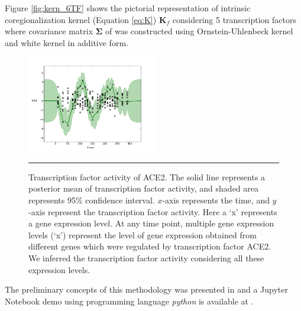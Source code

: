 Figure \ref{fig:kern_6TF} shows the pictorial representation of intrinsic coregionalization kernel (Equation \ref{eq:K}) $\textbf{K}_f$ considering 5 transcription factors where covariance matrix $\boldsymbol{\Sigma}$ of  was constructed using Ornstein-Uhlenbeck kernel and white kernel in additive form.
\begin{figure}[!htbp]
	\centering
	\includegraphics[width=0.5\textwidth,keepaspectratio]{diagrams/ACE2_OU_Wh_9TF.png}
	\rule{25em}{0.5pt}
	\caption[Inference of transcription factor activity of ACE2]
	{Transcription factor activity of ACE2. The solid line represents a posterior mean of transcription factor activity, and shaded area represents 95\% confidence interval. $x$-axis represents the time, and $y$-axis represent the transcription factor activity. Here a \lq x\rq{ }represents a gene expression level. At any time point, multiple gene expression levels (\lq x\rq) represent the level of gene expression obtained from different genes which were regulated by transcription factor ACE2. We inferred the transcription factor activity considering all these expression levels.}
	\label{fig:TFA_of_of_ACE2}
\end{figure}


 The preliminary concepts of this methodology was presented in \cite{Rahman:2016} and a Jupyter Notebook demo using programming language \emph{python} is available at \cite{Muhammad:2014}.

